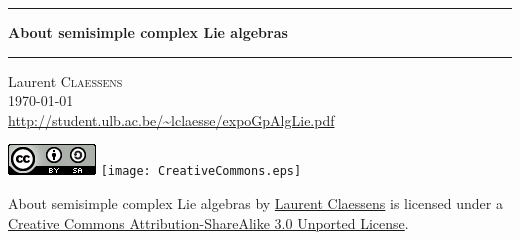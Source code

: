 



\makeindex
\makenomenclature








\thispagestyle{empty}
\begin{center}
  \begin{minipage}{15cm}
    \hrule\par
    \vspace{2mm}
    \begin{center}
    \Huge \bfseries About semisimple complex Lie algebras \par
    \end{center}
    \hrule\par
  \end{minipage}
\end{center}

\vspace{2cm}

\begin{center}
    Laurent \textsc{Claessens}\\
    \today\\
    \url{http://student.ulb.ac.be/~lclaesse/expoGpAlgLie.pdf}
\end{center}

\vfill

\begin{center}

        \ifpdf
            \includegraphics{CreativeCommons.png}
        \else
            \texttt{[image: CreativeCommons.eps]}
        \fi

        About semisimple complex Lie algebras by \href{http://student.ulb.ac.be/~lclaesse/research_page.html}{Laurent Claessens} is licensed under a \href{http://creativecommons.org/licenses/by-sa/3.0/}{Creative Commons Attribution-ShareAlike 3.0 Unported License}.
\end{center}


